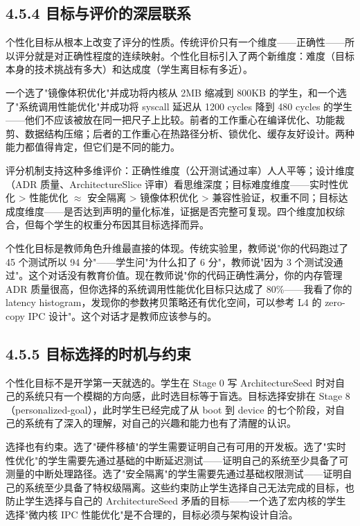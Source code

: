 \documentclass[UTF8,a4paper,12pt,openany]{ctexrep}
\begin{document}
\subsection{4.5.4 目标与评价的深层联系}\label{454-ux76eeux6807ux4e0eux8bc4ux4ef7ux7684ux6df1ux5c42ux8054ux7cfb}

个性化目标从根本上改变了评分的性质。传统评价只有一个维度------正确性------所以评分就是对正确性程度的连续映射。个性化目标引入了两个新维度：难度（目标本身的技术挑战有多大）和达成度（学生离目标有多近）。

一个选了"镜像体积优化"并成功将内核从 2MB 缩减到 800KB 的学生，和一个选了"系统调用性能优化"并成功将 syscall 延迟从 1200 cycles 降到 480 cycles 的学生------他们不应该被放在同一把尺子上比较。前者的工作重心在编译优化、功能裁剪、数据结构压缩；后者的工作重心在热路径分析、锁优化、缓存友好设计。两种能力都值得肯定，但它们是不同的能力。

评分机制支持这种多维评价：正确性维度（公开测试通过率）人人平等；设计维度（ADR 质量、ArchitectureSlice 评审）看思维深度；目标难度维度------实时性优化 \textgreater{} 性能优化 $\approx$ 安全隔离 \textgreater{} 镜像体积优化 \textgreater{} 兼容性验证，权重不同；目标达成度维度------是否达到声明的量化标准，证据是否完整可复现。四个维度加权综合，但每个学生的权重分布因其目标选择而异。

个性化目标是教师角色升维最直接的体现。传统实验里，教师说"你的代码跑过了 45 个测试所以 94 分"------学生问"为什么扣了 6 分"，教师说"因为 3 个测试没通过"。这个对话没有教育价值。现在教师说"你的代码正确性满分，你的内存管理 ADR 质量很高，但你选择的系统调用性能优化目标只达成了 80\%------我看了你的 latency histogram，发现你的参数拷贝策略还有优化空间，可以参考 L4 的 zero-copy IPC 设计"。这个对话才是教师应该参与的。

\subsection{4.5.5 目标选择的时机与约束}\label{455-ux76eeux6807ux9009ux62e9ux7684ux65f6ux673aux4e0eux7ea6ux675f}

个性化目标不是开学第一天就选的。学生在 Stage 0 写 ArchitectureSeed 时对自己的系统只有一个模糊的方向感，此时选目标等于盲选。目标选择安排在 Stage 8（personalized-goal），此时学生已经完成了从 boot 到 device 的七个阶段，对自己的系统有了深入的理解，对自己的兴趣和能力也有了清醒的认识。

选择也有约束。选了"硬件移植"的学生需要证明自己有可用的开发板。选了"实时性优化"的学生需要先通过基础的中断延迟测试------证明自己的系统至少具备了可测量的中断处理路径。选了"安全隔离"的学生需要先通过基础权限测试------证明自己的系统至少具备了特权级隔离。这些约束防止学生选择自己无法完成的目标，也防止学生选择与自己的 ArchitectureSeed 矛盾的目标------一个选了宏内核的学生选择"微内核 IPC 性能优化"是不合理的，目标必须与架构设计自洽。
\end{document}
